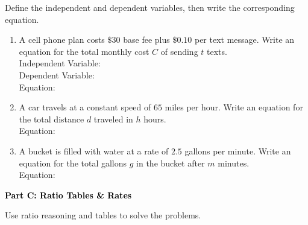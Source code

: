 \documentclass[12pt, letterpaper, fleqn]{article}
\newcommand{\blanklong}{\underline{\hspace{6.5cm}}}
\begin{document}
\vspace{3mm}

\noindent
Define the independent and dependent variables, then write the corresponding equation.

\vspace{5mm}

\begin{enumerate}[itemsep=2.2cm, leftmargin=0.6cm]
\item A cell phone plan costs $\$30$ base fee plus $\$0.10$ per text message. Write an equation for the total monthly cost $C$ of sending $t$ texts. \\
Independent Variable: \blanklong \\
Dependent Variable: \blanklong \\
Equation: \blanklong

\item A car travels at a constant speed of $65$ miles per hour. Write an equation for the total distance $d$ traveled in $h$ hours. \\
Equation: \blanklong

\item A bucket is filled with water at a rate of $2.5$ gallons per minute. Write an equation for the total gallons $g$ in the bucket after $m$ minutes. \\
Equation: \blanklong
\end{enumerate}

\newpage

\begin{tcolorbox}[colback=black!10]
    \large\textcolor{black}{\textbf{Part C: Ratio Tables \& Rates}}
\end{tcolorbox}

\vspace{3mm}

\noindent
Use ratio reasoning and tables to solve the problems.

\vspace{5mm}
\end{document}
